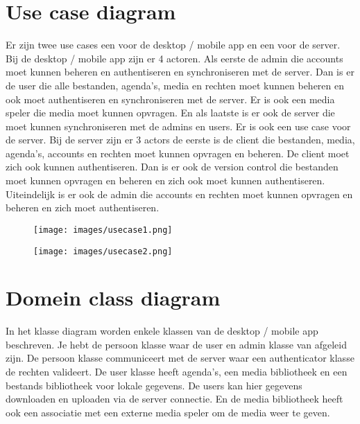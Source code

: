 
\section{Use case diagram}
\label{sec:usecase}

Er zijn twee use cases een voor de desktop / mobile app en een voor de server. 
Bij de desktop / mobile app zijn er 4 actoren. Als eerste de admin die accounts 
moet kunnen beheren en authentiseren en synchroniseren met de server. 
Dan is er de user die alle bestanden, agenda’s, media en rechten moet kunnen 
beheren en ook moet authentiseren en synchroniseren met de server. Er is ook 
een media speler die media moet kunnen opvragen. En als laatste is er ook de 
server die moet kunnen synchroniseren met de admins en users.
Er is ook een use case voor de server. Bij de server zijn er 3 actors de eerste 
is de client die bestanden, media, agenda’s, accounts en rechten moet kunnen 
opvragen en beheren. De client moet zich ook kunnen authentiseren. Dan is er 
ook de version control die bestanden moet kunnen opvragen en beheren en zich 
ook moet kunnen authentiseren. Uiteindelijk is er ook de admin die accounts en 
rechten moet kunnen opvragen en beheren en zich moet authentiseren.

\begin{figure}[H]
  \centering
  \texttt{[image: images/usecase1.png]}
  \label{figure:usecase1diagram}
\end{figure}

\begin{figure}[H]
  \centering
  \texttt{[image: images/usecase2.png]}
  \label{figure:usecase2diagram}
\end{figure}

\newpage

\section{Domein class diagram}
\label{sec:domeinclass}

In het klasse diagram worden enkele klassen van de desktop / mobile app 
beschreven. Je hebt de persoon klasse waar de user en admin klasse van afgeleid 
zijn. De persoon klasse communiceert met de server waar een authenticator 
klasse de rechten valideert. De user klasse heeft agenda’s, een media 
bibliotheek en een bestands bibliotheek voor lokale gegevens. De users kan hier 
gegevens downloaden en uploaden via de server connectie. En de media 
bibliotheek heeft ook een associatie met een externe media speler om de media 
weer te geven.

